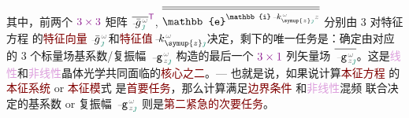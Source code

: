其中，前两个 $\textcolor{Plum}{3 \times 3}$ 矩阵 $\overline{\Xint{{}^{}_{\mathcolor{gray}{-}}}{10}{\bar{g}}^{\;\!\mathcolor{gray}{\omega}}_{\;\! \textcolor{PineGreen}{\jmath}}}^{\mathsf{\textcolor{Plum}{T}}}$, $\overline{\overline{\mathbb{e}^{\mathbb{i} \Xint{\begin{smallmatrix} ~ \\ {}^{}_{\mathcolor{gray}{-}} \\ ~ \end{smallmatrix}}{15}{k}_{\symup{z} \textcolor{PineGreen}{\jmath}}^{\;\! \mathcolor{gray}{\omega}} \mathcolor{gray}{z}}}}$ 分别由 3 对\textcolor{PineGreen}{特征方程}  的\textcolor{Maroon}{特征向量} $\Xint{{}^{}_{\mathcolor{gray}{-}}}{10}{\bar{g}}^{\;\!\mathcolor{gray}{\omega}}_{\;\! \textcolor{PineGreen}{\jmath}}$和\textcolor{Maroon}{特征值}$\Xint{\begin{smallmatrix} ~ \\ {}^{}_{\mathcolor{gray}{-}} \\ ~ \end{smallmatrix}}{15}{k}_{\symup{z} \textcolor{PineGreen}{\jmath}}^{\;\! \mathcolor{gray}{\omega}}$决定，剩下的唯一任务是：确定由对应的 3 个标量场\textcolor{PineGreen}{基系数}/\textcolor{PineGreen}{复振幅} $\Xint{\begin{smallmatrix} ~ \\ {}^{}_{\mathcolor{gray}{-}} \\ ~ \end{smallmatrix}}{09}{\mathtt{g}}^{\;\!\mathcolor{gray}{\omega}}_{\;\! \mathcolor{gray}{z} \textcolor{PineGreen}{\jmath}}$ 构造的最后一个 $\textcolor{Plum}{3 \times 1}$ 列矢量场 $\overline{\Xint{\begin{smallmatrix} ~ \\ {}^{}_{\mathcolor{gray}{-}} \\ ~ \end{smallmatrix}}{09}{\mathtt{g}}^{\;\!\mathcolor{gray}{\omega}}_{\;\! \mathcolor{gray}{z} \textcolor{PineGreen}{\jmath}}}$。这是\textcolor{Plum}{线性}和\textcolor{Plum}{非线性}\textcolor{PineGreen}{晶体光学}共同面临的\textcolor{Maroon}{核心之二}。--- 也就是说，如果说计算\textcolor{Maroon}{本征方程}  的\textcolor{Maroon}{本征系统} or \textcolor{Maroon}{本征模}式  是\textcolor{Maroon}{首要任务}，那么计算满足\textcolor{Maroon}{边界条件}  和\textcolor{Plum}{非线性}混频  联合决定的\textcolor{PineGreen}{基系数} or \textcolor{PineGreen}{复振幅} $\Xint{\begin{smallmatrix} ~ \\ {}^{}_{\mathcolor{gray}{-}} \\ ~ \end{smallmatrix}}{09}{\mathtt{g}}^{\;\!\mathcolor{gray}{\omega}}_{\;\! \mathcolor{gray}{z} \textcolor{PineGreen}{\jmath}}$ 则是\textcolor{Maroon}{第二紧急的次要任务}。

